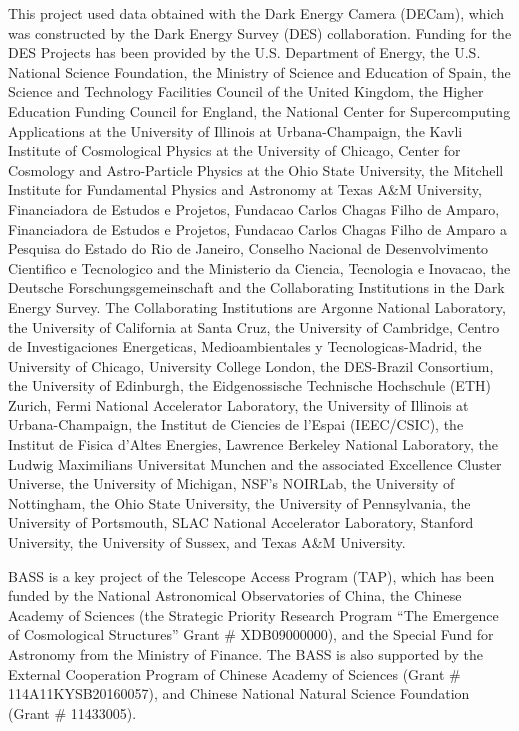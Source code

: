 \documentclass[twocolumn]{aastex62}
\begin{document}
This project used data obtained with the Dark Energy Camera (DECam), which was constructed by the Dark Energy Survey (DES) collaboration. Funding for the DES Projects has been provided by the U.S. Department of Energy, the U.S. National Science Foundation, the Ministry of Science and Education of Spain, the Science and Technology Facilities Council of the United Kingdom, the Higher Education Funding Council for England, the National Center for Supercomputing Applications at the University of Illinois at Urbana-Champaign, the Kavli Institute of Cosmological Physics at the University of Chicago, Center for Cosmology and Astro-Particle Physics at the Ohio State University, the Mitchell Institute for Fundamental Physics and Astronomy at Texas A\&M University, Financiadora de Estudos e Projetos, Fundacao Carlos Chagas Filho de Amparo, Financiadora de Estudos e Projetos, Fundacao Carlos Chagas Filho de Amparo a Pesquisa do Estado do Rio de Janeiro, Conselho Nacional de Desenvolvimento Cientifico e Tecnologico and the Ministerio da Ciencia, Tecnologia e Inovacao, the Deutsche Forschungsgemeinschaft and the Collaborating Institutions in the Dark Energy Survey. The Collaborating Institutions are Argonne National Laboratory, the University of California at Santa Cruz, the University of Cambridge, Centro de Investigaciones Energeticas, Medioambientales y Tecnologicas-Madrid, the University of Chicago, University College London, the DES-Brazil Consortium, the University of Edinburgh, the Eidgenossische Technische Hochschule (ETH) Zurich, Fermi National Accelerator Laboratory, the University of Illinois at Urbana-Champaign, the Institut de Ciencies de l’Espai (IEEC/CSIC), the Institut de Fisica d’Altes Energies, Lawrence Berkeley National Laboratory, the Ludwig Maximilians Universitat Munchen and the associated Excellence Cluster Universe, the University of Michigan, NSF’s NOIRLab, the University of Nottingham, the Ohio State University, the University of Pennsylvania, the University of Portsmouth, SLAC National Accelerator Laboratory, Stanford University, the University of Sussex, and Texas A\&M University.

BASS is a key project of the Telescope Access Program (TAP), which has been funded by the National Astronomical Observatories of China, the Chinese Academy of Sciences (the Strategic Priority Research Program “The Emergence of Cosmological Structures” Grant \# XDB09000000), and the Special Fund for Astronomy from the Ministry of Finance. The BASS is also supported by the External Cooperation Program of Chinese Academy of Sciences (Grant \# 114A11KYSB20160057), and Chinese National Natural Science Foundation (Grant \# 11433005).
\end{document}
